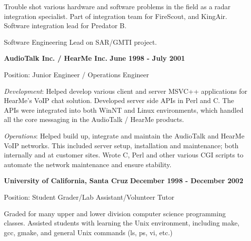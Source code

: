 \documentclass{article}
\begin{document}
\vspace{\baselineskip}
Trouble shot various hardware and software problems in the field as a radar
integration specialist.  Part of integration team for FireScout, and KingAir.
Software integration lead for Predator B.
\par

\pagebreak


\vspace{\baselineskip}
Software Engineering Lead on SAR/GMTI project.

\vspace{\baselineskip}
{\bf AudioTalk Inc. / HearMe Inc.} 
\hfill {\bf June 1998 - July 2001} 
\par
Position:  Junior Engineer / Operations Engineer
\vspace{.03in}
\par
\textit{Development}: Helped develop various client and server 
MSVC++ applications for HearMe's VoIP chat solution.  Developed 
server side APIs in Perl and C.  The APIs were integrated into 
both WinNT and Linux environments, which handled all the core messaging
in the AudioTalk / HearMe products.
\par
\textit{Operations}: Helped build up, integrate and maintain the AudioTalk and HearMe VoIP 
networks.  This included server setup, installation and maintenance; both 
internally and at customer sites.  Wrote C, Perl and other various CGI 
scripts to automate the network maintenance and ensure stability.

\vspace{\baselineskip}
{\bf University of California, Santa Cruz} 
\hfill {\bf December 1998 - December 2002}
\par
Position:  Student Grader/Lab Assistant/Volunteer Tutor
\par
\vspace{.03in}
Graded for many upper and lower division computer science programming 
classes.  Assisted students with learning the Unix environment, including
make, gcc, gmake, and general Unix commands (ls, ps, vi, etc.)
\end{document}
